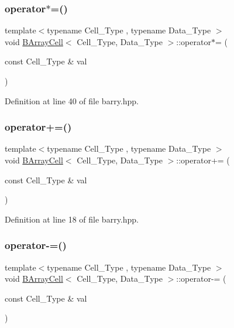 \subsubsection{\texorpdfstring{operator$\ast$=()}{operator*=()}}
{\footnotesize\ttfamily template$<$typename Cell\+\_\+\+Type , typename Data\+\_\+\+Type $>$ \\
void \hyperlink{classbarry_1_1_b_array_cell}{B\+Array\+Cell}$<$ Cell\+\_\+\+Type, Data\+\_\+\+Type $>$\+::operator$\ast$= (\begin{DoxyParamCaption}\item[{const Cell\+\_\+\+Type \&}]{val }\end{DoxyParamCaption})\hspace{0.3cm}{\ttfamily [inline]}}



Definition at line 40 of file barry.\+hpp.

\mbox{\label{classbarry_1_1_b_array_cell_a2e5c7efcf17bf4acaf17900fb781827b}} 
\subsubsection{\texorpdfstring{operator+=()}{operator+=()}}
{\footnotesize\ttfamily template$<$typename Cell\+\_\+\+Type , typename Data\+\_\+\+Type $>$ \\
void \hyperlink{classbarry_1_1_b_array_cell}{B\+Array\+Cell}$<$ Cell\+\_\+\+Type, Data\+\_\+\+Type $>$\+::operator+= (\begin{DoxyParamCaption}\item[{const Cell\+\_\+\+Type \&}]{val }\end{DoxyParamCaption})\hspace{0.3cm}{\ttfamily [inline]}}



Definition at line 18 of file barry.\+hpp.

\mbox{\label{classbarry_1_1_b_array_cell_a2f2d39b5e9dfe7d0ef62a42445c85439}} 
\subsubsection{\texorpdfstring{operator-\/=()}{operator-=()}}
{\footnotesize\ttfamily template$<$typename Cell\+\_\+\+Type , typename Data\+\_\+\+Type $>$ \\
void \hyperlink{classbarry_1_1_b_array_cell}{B\+Array\+Cell}$<$ Cell\+\_\+\+Type, Data\+\_\+\+Type $>$\+::operator-\/= (\begin{DoxyParamCaption}\item[{const Cell\+\_\+\+Type \&}]{val }\end{DoxyParamCaption})\hspace{0.3cm}{\ttfamily [inline]}}



